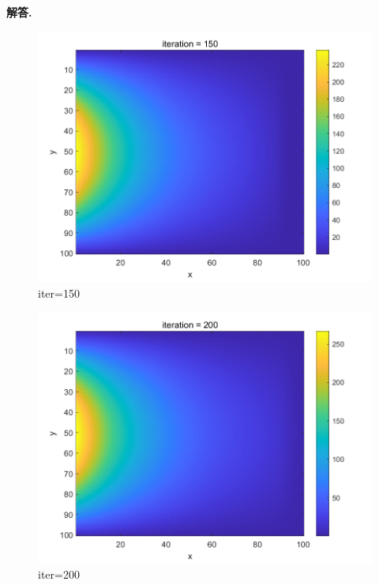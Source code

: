 \documentclass[12pt, a4paper, oneside, UTF8]{ctexart}
\newenvironment{solution}{\par\noindent\textbf{解答. }}{\par}
\begin{document}
\begin{solution}
\begin{figure}[h]
\begin{minipage}[b]{0.3\textwidth}
            \centering
            \includegraphics[width=\textwidth]{Problem3_3.png}
            \caption{iter=150}
        \end{minipage}
    \end{figure}
    \begin{figure}[h]
        \centering
        \begin{minipage}[b]{0.3\textwidth}
            \centering
            \includegraphics[width=\textwidth]{Problem3_4.png}
            \caption{iter=200}
        \end{minipage}
        \begin{minipage}[b]{0.3\textwidth}
            \centering

\end{minipage}
\end{figure}
\end{solution}
\end{document}
